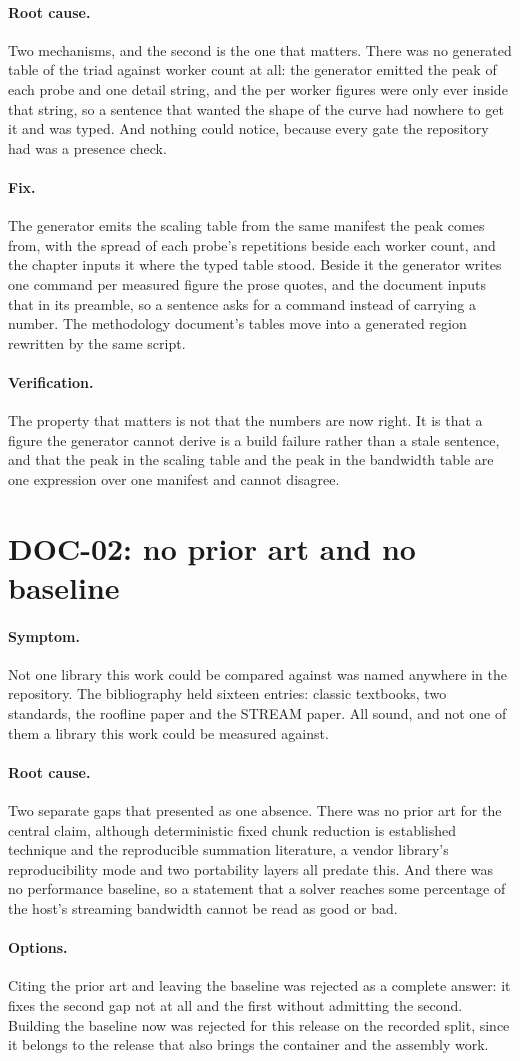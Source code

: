 \documentclass[11pt,a4paper]{report}
\newcommand{\symptom}[1]{\paragraph{Symptom.}#1}
\newcommand{\rootcause}[1]{\paragraph{Root cause.}#1}
\newcommand{\options}[1]{\paragraph{Options.}#1}
\newcommand{\fix}[1]{\paragraph{Fix.}#1}
\newcommand{\verification}[1]{\paragraph{Verification.}#1}
\begin{document}
\rootcause{Two mechanisms, and the second is the one that matters. There was no
generated table of the triad against worker count at all: the generator emitted
the peak of each probe and one detail string, and the per worker figures were
only ever inside that string, so a sentence that wanted the shape of the curve
had nowhere to get it and was typed. And nothing could notice, because every gate
the repository had was a presence check.}

\fix{The generator emits the scaling table from the same manifest the peak comes
from, with the spread of each probe's repetitions beside each worker count, and
the chapter inputs it where the typed table stood. Beside it the generator writes
one command per measured figure the prose quotes, and the document inputs that in
its preamble, so a sentence asks for a command instead of carrying a number. The
methodology document's tables move into a generated region rewritten by the same
script.}

\verification{The property that matters is not that the numbers are now right. It
is that a figure the generator cannot derive is a build failure rather than a
stale sentence, and that the peak in the scaling table and the peak in the
bandwidth table are one expression over one manifest and cannot disagree.}

\section{DOC-02: no prior art and no baseline}

\symptom{Not one library this work could be compared against was named anywhere
in the repository. The bibliography held sixteen entries: classic textbooks, two
standards, the roofline paper and the STREAM paper. All sound, and not one of
them a library this work could be measured against.}

\rootcause{Two separate gaps that presented as one absence. There was no prior
art for the central claim, although deterministic fixed chunk reduction is
established technique and the reproducible summation literature, a vendor
library's reproducibility mode and two portability layers all predate this. And
there was no performance baseline, so a statement that a solver reaches some
percentage of the host's streaming bandwidth cannot be read as good or bad.}

\options{Citing the prior art and leaving the baseline was rejected as a complete
answer: it fixes the second gap not at all and the first without admitting the
second. Building the baseline now was rejected for this release on the recorded
split, since it belongs to the release that also brings the container and the
assembly work.}
\end{document}
